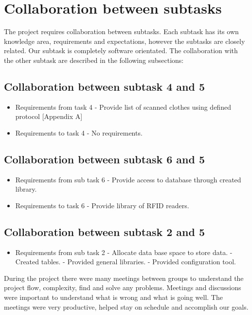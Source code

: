 %
\section{Collaboration between subtasks}

The project requires collaboration between subtasks. Each subtask has its own knowledge area, requirements and expectations, however the subtasks are closely related. Our subtask is completely software orientated. The collaboration with the other subtask are described in the following subsections:

\subsection{Collaboration between subtask 4 and 5}
\begin{itemize}
	\item Requirements from task 4
	\subitem - Provide list of scanned clothes using defined protocol [Appendix A]
	\item Requirements to task 4
	\subitem - No requirements.
\end{itemize}

\subsection{Collaboration between subtask 6 and 5}
\begin{itemize}
	\item Requirements from sub task 6
	\subitem - Provide access to database through created library.
	\item Requirements to task 6
	\subitem - Provide library of RFID readers.
\end{itemize}

\subsection{Collaboration between subtask 2 and 5}
\begin{itemize}
	\item Requirements from sub task 2
	\subitem - Allocate data base space to store data.
	\subitem - Created tables.
	\subitem - Provided general libraries.
	\subitem - Provided configuration tool.
\end{itemize}

During the project there were many meetings between groups to understand the project flow, complexity, find and solve any problems. Meetings and discussions were important to understand what is wrong and what is going well. The meetings were very productive, helped stay on schedule and accomplish our goals.